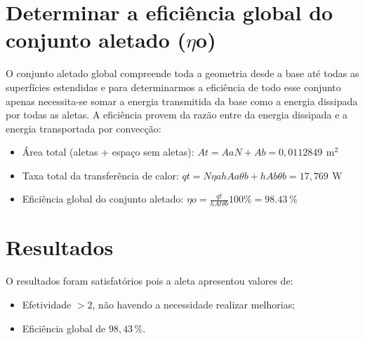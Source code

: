 \section{Determinar a eficiência global do conjunto aletado (\(\eta\)o)}\label{sec:f}

\par O conjunto aletado global compreende toda a geometria desde a base até todas as superfícies estendidas e 
para determinarmos a eficiência de todo esse conjunto
apenas necessita-se somar a energia transmitida da base
como a energia dissipada por todas as aletas.
A eficiência provem da razão entre da energia  dissipada e a energia transportada por convecção:

\begin{itemize}[leftmargin=2cm]
    \item Área total (aletas + espaço sem aletas): \(
          {At}={{Aa}{N}+{Ab}} = {0,0112849}\,\SI{}{\square\meter}
          \)
    \item Taxa total da transferência de calor: \(
          {qt}=
          {{N}{{\eta}a}{h}{Aa}{{\theta}b}}+{{h}{Ab}{{\theta}b}}=
              {17,769\,\SI{}\watt}
          \)
    \item Eficiência global do conjunto aletado: \(
          {\eta}o=
          {\frac{qt}{{h}{At}{\theta}b}}{100\%}=
          {\SI{98,43}{\percent}}
          \)
\end{itemize}

\section{
  Resultados
 }\label{sec:results}

O resultados foram satisfatórios pois a aleta apresentou valores de:
\begin{itemize}[leftmargin=2cm]
    \item Efetividade \boldmath\(> 2\), não havendo a necessidade realizar melhorias;
    \item Eficiência global de \boldmath\(98,43\,\%\).
\end{itemize}